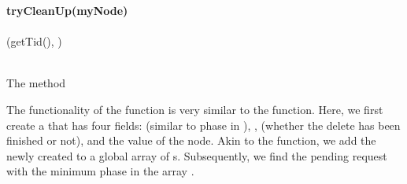 \documentclass{llncs}
\begin{document}
\vspace{-7mm}
\begin{algorithm}
\scriptsize
\SetAlgoLined
\textbf{tryCleanUp(myNode)} \\
	  \\
	\While{  }
	{
		{
			{
				(getTid(), ) \label{line:callclean}
			}
			\\
		}
		  \\
	}
\caption{The  method} \label{alg:tryClean}
\end{algorithm}
\vspace{-7mm}
\begin{comment}
\begin{algorithm}
\scriptsize
\SetAlgoLined
\textbf{class DeleteRequest}{}\\
		\hspace{5mm} \\
		\hspace{5mm} \\
		\hspace{5mm} \\
        \hspace{5mm}  \\	

\vskip 1mm
AtomicReferenceArrayDeleteRequest allDeleteRequests

\caption{ } \label{alg:deleteclasses}
\end{algorithm}
\end{comment}
The functionality of the  function is very similar to the  function. 
Here, we first create a  that has four fields:  (similar to phase in ), 
,  (whether the delete has been finished or not), and  the value of the  node. 
Akin to the  function, we add the newly created  to a global array of s.
Subsequently, we find the pending request with the minimum phase in the array . 
\end{document}
